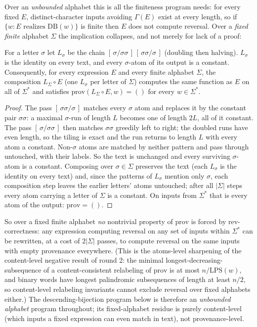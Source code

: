Over an \emph{unbounded} alphabet this is all the finiteness program
needs: for every fixed $E$, distinct-character inputs avoiding
$\Gamma(E)$ exist at every length, so if $\{w : E \text{ realizes }
\mathrm{DB}(w)\}$ is finite then $E$ does not compute reversal.
Over a \emph{fixed finite} alphabet $\Sigma$ the implication
collapses, and not merely for lack of a proof:

\begin{theorem}[laundering]
    \label{thm:laundering}
    For a letter $\sigma$ let $L_\sigma$ be the chain
    $[\,\sigma/\sigma\sigma\,]\,[\,\sigma\sigma/\sigma\,]$ (doubling
    then halving).  $L_\sigma$ is the identity on every text, and
    every $\sigma$-atom of its output is a constant.  Consequently,
    for every expression $E$ and every finite alphabet $\Sigma$,
    the composition $L_\Sigma \circ E$ (one $L_\sigma$ per letter of
    $\Sigma$) computes the same function as $E$ on all of
    $\Sigma^{*}$ and satisfies $\mathrm{prov}(L_\Sigma \circ E, w) =
    ()$ for every $w \in \Sigma^{*}$.
\end{theorem}

\begin{proof}
    The pass $[\,\sigma\sigma/\sigma\,]$ matches every $\sigma$ atom
    and replaces it by the constant pair $\sigma\sigma$: a maximal
    $\sigma$-run of length $L$ becomes one of length $2L$, all of it
    constant.  The pass $[\,\sigma/\sigma\sigma\,]$ then matches
    $\sigma\sigma$ greedily left to right; the doubled runs have even
    length, so the tiling is exact and the run returns to length $L$
    with every atom a constant.  Non-$\sigma$ atoms are matched by
    neither pattern and pass through untouched, with their labels.  So
    the text is unchanged and every surviving $\sigma$-atom is a
    constant.  Composing over $\sigma \in \Sigma$ preserves the text
    (each $L_\sigma$ is the identity on every text) and, since the
    patterns of $L_\sigma$ mention only $\sigma$, each composition
    step leaves the earlier letters' atoms untouched; after all
    $|\Sigma|$ steps every atom carrying a letter of $\Sigma$ is a
    constant.  On inputs from $\Sigma^{*}$ that is every atom of the
    output: $\mathrm{prov} = ()$.
\end{proof}

\noindent So over a fixed finite alphabet \emph{no} nontrivial
property of $\mathrm{prov}$ is forced by rev-correctness: any
expression computing reversal on any set of inputs within
$\Sigma^{*}$ can be rewritten, at a cost of $2|\Sigma|$ passes, to
compute reversal on the same inputs with empty provenance
everywhere.  (This is the atoms-level sharpening of the content-level
negative result of round 2: the minimal longest-decreasing-subsequence
of a content-consistent relabeling of $\mathrm{prov}$ is at most
$n/\mathrm{LPS}(w)$, and binary words have longest palindromic
subsequences of length at least $n/2$, so content-level relabeling
invariants cannot exclude reversal over fixed alphabets either.)  The
descending-bijection program below is therefore an \emph{unbounded
alphabet} program throughout; its fixed-alphabet residue is purely
content-level (which inputs a fixed expression can even match in
text), not provenance-level.

